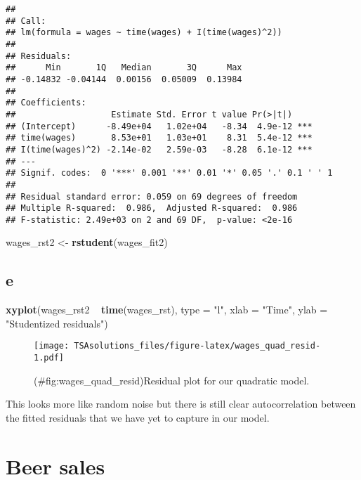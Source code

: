 \documentclass[]{book}
\newenvironment{Shaded}{\begin{snugshade}}{\end{snugshade}}
\newcommand{\KeywordTok}[1]{\textcolor[rgb]{0.13,0.29,0.53}{\textbf{{#1}}}}
\newcommand{\DataTypeTok}[1]{\textcolor[rgb]{0.13,0.29,0.53}{{#1}}}
\newcommand{\StringTok}[1]{\textcolor[rgb]{0.31,0.60,0.02}{{#1}}}
\newcommand{\NormalTok}[1]{{#1}}
\theoremstyle{definition}
\theoremstyle{definition}
\theoremstyle{remark}
\begin{document}
\begin{verbatim}
## 
## Call:
## lm(formula = wages ~ time(wages) + I(time(wages)^2))
## 
## Residuals:
##      Min       1Q   Median       3Q      Max 
## -0.14832 -0.04144  0.00156  0.05009  0.13984 
## 
## Coefficients:
##                   Estimate Std. Error t value Pr(>|t|)    
## (Intercept)      -8.49e+04   1.02e+04   -8.34  4.9e-12 ***
## time(wages)       8.53e+01   1.03e+01    8.31  5.4e-12 ***
## I(time(wages)^2) -2.14e-02   2.59e-03   -8.28  6.1e-12 ***
## ---
## Signif. codes:  0 '***' 0.001 '**' 0.01 '*' 0.05 '.' 0.1 ' ' 1
## 
## Residual standard error: 0.059 on 69 degrees of freedom
## Multiple R-squared:  0.986,  Adjusted R-squared:  0.986 
## F-statistic: 2.49e+03 on 2 and 69 DF,  p-value: <2e-16
\end{verbatim}

\begin{Shaded}
\begin{Highlighting}[]
\NormalTok{wages_rst2 <-}\StringTok{ }\KeywordTok{rstudent}\NormalTok{(wages_fit2)}
\end{Highlighting}
\end{Shaded}

\subsection*{e}\label{e-1}

\begin{Shaded}
\begin{Highlighting}[]
\KeywordTok{xyplot}\NormalTok{(wages_rst2 ~}\StringTok{ }\KeywordTok{time}\NormalTok{(wages_rst), }\DataTypeTok{type =} \StringTok{"l"}\NormalTok{,}
       \DataTypeTok{xlab =} \StringTok{"Time"}\NormalTok{, }\DataTypeTok{ylab =} \StringTok{"Studentized residuals"}\NormalTok{)}
\end{Highlighting}
\end{Shaded}

\begin{figure}[htbp]
\centering
\texttt{[image: TSAsolutions\_files/figure-latex/wages\_quad\_resid-1.pdf]}
\caption{(\#fig:wages\_quad\_resid)Residual plot for our quadratic
model.}
\end{figure}

This looks more like random noise but there is still clear
autocorrelation between the fitted residuals that we have yet to capture
in our model.

\section{Beer sales}\label{beer-sales}
\end{document}
